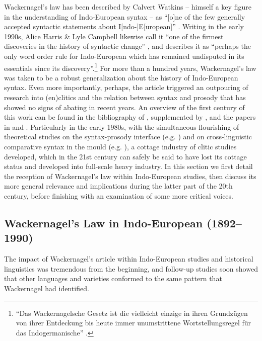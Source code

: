 \documentclass[output=paper]{../langscibook}
\begin{document}
Wackernagel's law has been described by Calvert Watkins -- himself a key figure in the understanding of Indo-European syntax -- as ``[o]ne of the few generally accepted syntactic statements about I[ndo-]E[uropean]'' \citep[1036]{Watkins1964}. Writing in the early 1990s, Alice Harris \& Lyle Campbell likewise call it ``one of the firmest discoveries in the history of syntactic change'' \citep[29]{HarrisCampbell1995}, and \citet{Krisch1990} describes it as ``perhaps the only word order rule for Indo-European which has remained undisputed in its essentials since its discovery''.\footnote{``Das Wackernagelsche Gesetz ist die vielleicht einzige in ihren Grundzügen von ihrer Entdeckung bis heute immer unumstrittene Wortstellungsregel für das Indogermanische'' \citep[64--65]{Krisch1990}.} For more than a hundred years, Wackernagel's law was taken to be a robust generalization about the history of Indo-European syntax. Even more importantly, perhaps, the article triggered an outpouring of research into (en)clitics and the relation between syntax and prosody that has showed no signs of abating in recent years. An overview of the first century of this work can be found in the bibliography of \citet{NevisEtal1994}, supplemented by \citet{Janse1994}, and the papers in \citet{EichnerRix1990} and \citet{HalpernZwicky1996}. Particularly in the early 1980s, with the simultaneous flourishing of theoretical studies on the syntax-prosody interface (e.g. \citealp{Klavans1982,Kaisse1985,Selkirk1984,Selkirk1986,NesporVogel1986})
and on cross-linguistic comparative syntax in the  mould (e.g. \citealp{Chomsky1981,Rizzi1982,Hale1983}), a cottage industry of clitic studies developed, which in the 21st century can safely be said to have lost its cottage status and developed into full-scale heavy industry. In this section we first detail the reception of Wackernagel's law within Indo-European studies, then discuss its more general relevance and implications during the latter part of the 20th century, before finishing with an examination of some more critical voices.

\subsection{Wackernagel's Law in Indo-European (1892--1990)}

The impact of Wackernagel's article within Indo-European studies and historical linguistics was tremendous from the beginning, and follow-up studies soon showed that other languages and varieties conformed to the same pattern that Wackernagel had identified. 
\end{document}
